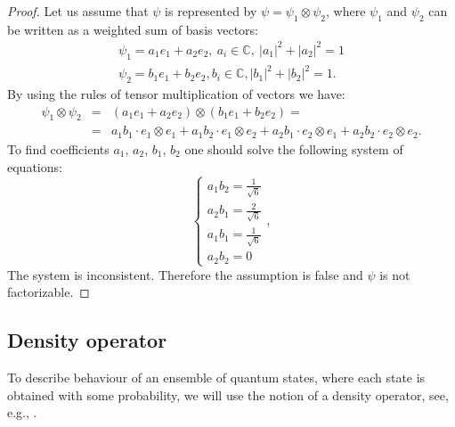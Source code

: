 \documentclass[%
master,         %
subf,           %
href,           %
colorlinks=true %
]{disser}
\numberwithin{equation}{section}
\numberwithin{figure}{section}
\begin{document}
\begin{proof}
Let us assume that $\psi$ is represented by $\psi = \psi_1\otimes\psi_2$, where $\psi_1$ and $\psi_2$ can be written as a weighted sum of basis vectors:
\begin{gather*}
	\psi_1 = a_1 e_1 + a_2 e_2,\ a_i\in \mathbb{C},\ |a_1|^2 + |a_2|^2 = 1 \\
	\psi_2 = b_1 e_1 + b_2 e_2, b_i\in \mathbb{C}, |b_1|^2 + |b_2|^2 = 1.
\end{gather*}
By using the rules of tensor multiplication of vectors we have:
\begin{eqnarray*}
	\psi_1 \otimes \psi_2 &=& (a_1 e_1 + a_2 e_2) \otimes (b_1 e_1 + b_2 e_2) = \\ &=&  
	a_1 b_1 \cdot e_1 \otimes e_1 + a_1 b_2 \cdot e_1 \otimes e_2 + 
	a_2 b_1 \cdot e_2 \otimes e_1 + a_2 b_2 \cdot e_2 \otimes e_2.
\end{eqnarray*}
To find coefficients $a_1$, $a_2$, $b_1$, $b_2$ one should solve the following system of equations:
$$
\begin{cases}
a_1 b_2 = \frac{1}{\sqrt{6}} \\
a_2 b_1 = \frac{2}{\sqrt{6}} \\
a_1 b_1 = \frac{1}{\sqrt{6}} \\
a_2 b_2 = 0
\end{cases},
$$
The system is inconsistent. Therefore the assumption is false and $\psi$ is not factorizable.
\end{proof}


\subsection{Density operator}

To describe behaviour of an ensemble of quantum states, where each state is obtained with some probability, we will use the notion of a density operator, see, e.g., \cite{Khrennikov_information, khrennikov_contextual}.
\end{document}
